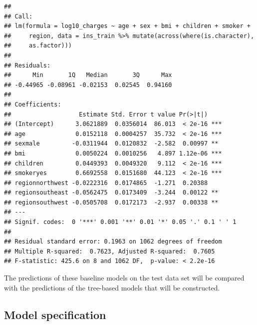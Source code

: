 \documentclass[
]{book}
\begin{document}
\begin{verbatim}
## 
## Call:
## lm(formula = log10_charges ~ age + sex + bmi + children + smoker + 
##     region, data = ins_train %>% mutate(across(where(is.character), 
##     as.factor)))
## 
## Residuals:
##      Min       1Q   Median       3Q      Max 
## -0.44965 -0.08961 -0.02153  0.02545  0.94160 
## 
## Coefficients:
##                   Estimate Std. Error t value Pr(>|t|)    
## (Intercept)      3.0621889  0.0356014  86.013  < 2e-16 ***
## age              0.0152118  0.0004257  35.732  < 2e-16 ***
## sexmale         -0.0311944  0.0120832  -2.582  0.00997 ** 
## bmi              0.0050224  0.0010256   4.897 1.12e-06 ***
## children         0.0449393  0.0049320   9.112  < 2e-16 ***
## smokeryes        0.6692558  0.0151680  44.123  < 2e-16 ***
## regionnorthwest -0.0222316  0.0174865  -1.271  0.20388    
## regionsoutheast -0.0562475  0.0173409  -3.244  0.00122 ** 
## regionsouthwest -0.0505708  0.0172173  -2.937  0.00338 ** 
## ---
## Signif. codes:  0 '***' 0.001 '**' 0.01 '*' 0.05 '.' 0.1 ' ' 1
## 
## Residual standard error: 0.1963 on 1062 degrees of freedom
## Multiple R-squared:  0.7623, Adjusted R-squared:  0.7605 
## F-statistic: 425.6 on 8 and 1062 DF,  p-value: < 2.2e-16
\end{verbatim}

The predictions of these baseline models on the test data set will be compared with the predictions of the tree-based models that will be constructed.

\hypertarget{model-specification-1}{%
\subsection{Model specification}\label{model-specification-1}}
\end{document}
